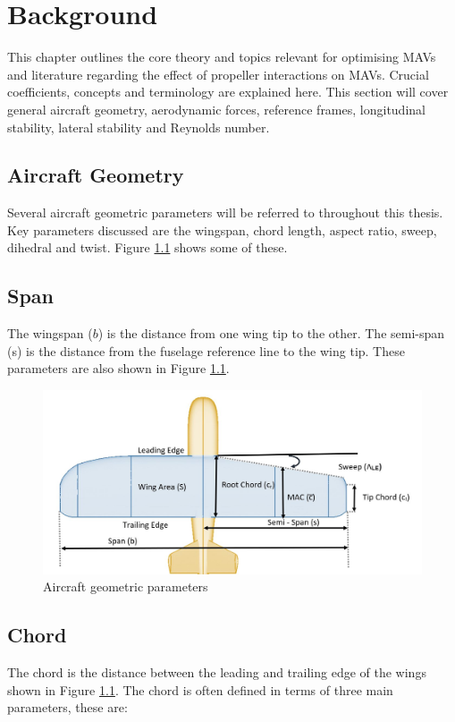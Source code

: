 
\graphicspath{{./Figs/}}

\chapter{Background} 
This chapter outlines the core theory and topics relevant for optimising MAVs and literature regarding the effect of propeller interactions on MAVs. Crucial coefficients, concepts and terminology are explained here. This section will cover general aircraft geometry, aerodynamic forces, reference frames, longitudinal stability, lateral stability and Reynolds number. 

\section{Aircraft Geometry}
Several aircraft geometric parameters will be referred to throughout this thesis. Key parameters discussed are the wingspan, chord length, aspect ratio, sweep, dihedral and twist. Figure \ref{fig:aircraftgeometry} shows some of these.

\section{Span}
The wingspan ($b$) is the distance from one wing tip to the other. The semi-span (s) is the distance from the fuselage reference line to the wing tip. These parameters are also shown in Figure \ref{fig:aircraftgeometry}. 

\begin{figure}[H]
  \centering
   \includegraphics[width=1\linewidth]{03_LiteratureReview/Figs/geometry.JPG}
  \caption{Aircraft geometric parameters}
  \label{fig:aircraftgeometry}
\end{figure}


\section{Chord}
The chord is the distance between the leading and trailing edge of the wings shown in Figure \ref{fig:aircraftgeometry}. The chord is often defined in terms of three main parameters, these are:

